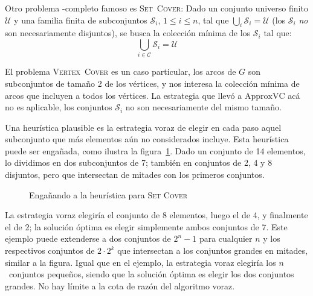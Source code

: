  Otro problema \NP\nobreakdash-completo famoso
  es \textsc{Set~Cover}:
  Dado un conjunto universo finito \(\mathscr{U}\)
  y una familia finita de subconjuntos \(\mathscr{S}_i\),
  \(1 \le i \le n\),
  tal que \(\bigcup_i \mathscr{S}_i = \mathscr{U}\)
  (los \(\mathscr{S}_i\) \emph{no} son necesariamente disjuntos),
  se busca la colección mínima de los \(\mathscr{S}_i\)
  tal que:
  \begin{equation*}
    \bigcup_{i \in \mathscr{C}} \mathscr{S}_i
      = \mathscr{U}
  \end{equation*}

  El problema \textsc{Vertex~Cover} es un caso particular,
  los arcos de \(G\) son subconjuntos de tamaño \num{2} de los vértices,
  y nos interesa la colección mínima de arcos
  que incluyen a todos los vértices.
  La estrategia que llevó a \(\mathrm{ApproxVC}\) acá no es aplicable,
  los conjuntos \(\mathscr{S}_i\) no son necesariamente del mismo tamaño.

  Una heurística plausible
  es la estrategia voraz de elegir en cada paso
  aquel subconjunto que más elementos aún no considerados incluye.
  Esta heurística puede ser engañada,
  como ilustra la figura~\ref{fig:SetCover-fools-greedy}.
  Dado un conjunto de \num{14} elementos,
  lo dividimos en dos subconjuntos de \num{7};
  también en conjuntos de \num{2}, \num{4} y \num{8} disjuntos,
  pero que intersectan de mitades con los primeros conjuntos.
  \begin{figure}[ht]
    \centering
    \caption{Engañando a la heurística para \textsc{Set Cover}}
    \label{fig:SetCover-fools-greedy}
  \end{figure}
  La estrategia voraz elegiría el conjunto de \num{8} elementos,
  luego el de \num{4},
  y finalmente el de \num{2};
  la solución óptima es elegir simplemente ambos conjuntos de \num{7}.
  Este ejemplo puede extenderse a dos conjuntos de \(2^n - 1\)
  para cualquier \(n\)
  y los respectivos conjuntos de \(2 \cdot 2^k\)
  que intersectan a los conjuntos grandes en mitades,
  similar a la figura.
  Igual que en el ejemplo,
  la estrategia voraz elegiría los \(n\)~conjuntos pequeños,
  siendo que la solución óptima es elegir los dos conjuntos grandes.
  No hay límite a la cota de razón del algoritmo voraz.

